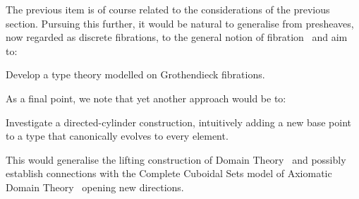 \documentclass[11pt,twocolumn]{article}
\newcounter{CC}
\newenvironment{resenumerate}
  {\begin{list}{[\textbf{\arabic{CC}]}}
  {\usecounter{CC}
   \setlength{\topsep}{2pt}
   \setlength{\partopsep}{2pt}
   \setlength{\itemsep}{2.5pt}
   \setlength{\parsep}{2.5pt}
   \setlength{\leftmargin}{1.65em}
   \setlength{\labelwidth}{1.15em}
 }}
  {\end{list}}
\begin{document}
The previous item is of course related to the considerations of the
previous section.  Pursuing this further, it would be natural to
generalise from presheaves, now regarded as discrete fibrations, to the
general notion of fibration~\cite{SGA1} and aim to:
\begin{resenumerate}\setcounter{CC}{3}
\item
  Develop a type theory modelled on Grothendieck fibrations.
\end{resenumerate}

As a final point, we note that yet another approach would be to:
\begin{resenumerate}\setcounter{CC}{4}
\item
  Investigate a directed-cylinder construction, intuitively adding a new base
  point to a type that canonically evolves to every element.  
\end{resenumerate}
This would generalise the lifting construction of Domain
Theory~\cite{LiftingKZ} and possibly establish connections with the
Complete Cuboidal Sets model of Axiomatic Domain
Theory~\cite{CompleteCuboidalSets} opening new directions.  
\end{document}
